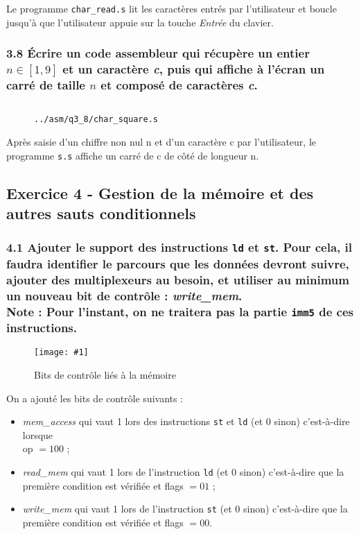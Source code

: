 \documentclass[twoside, 12pt, a4paper]{article}
\newcommand{\cf}[3]{
    \begin{figure}[!h]
        \centering
        \texttt{[image: \#1]}
    \caption{#3}\label{Fig:#1}
    \end{figure}
}
\newcommand{\hcf}[2]{\cf{#1}{.75}{#2}}
\newcommand{\fm}[2]{
\begin{figure}[!h]
    \centering
    \inputminted[]{asm}{#1}
    \caption{\texttt{#2}}
\end{figure}
}
\begin{document}
Le programme \texttt{char\_read.s} lit les caractères entrés par l'utilisateur et boucle jusqu'à que l'utilisateur appuie sur la touche \textit{Entrée} du clavier.

\clearpage

        \subsubsection*{\textbf{3.8} Écrire un code assembleur qui récupère un entier $n \in [1, 9]$ et un caractère \textit{c}, puis qui affiche à l'écran un carré de taille $n$ et composé de caractères \textit{c}.}

\fm{../asm/q3_8/char_square.s}{../asm/q3\_8/char\_square.s}

Après saisie d'un chiffre non nul n et d'un caractère c par l'utilisateur, le programme \texttt{s.s} affiche un carré de c de côté de longueur n. 
        
        \newpage

        \subsection{Exercice 4 - Gestion de la mémoire et des autres sauts conditionnels}

        \subsubsection*{\textbf{4.1} Ajouter le support des instructions \texttt{ld} et \texttt{st}. Pour cela, il faudra identifier le parcours que les données devront suivre, ajouter des multiplexeurs au besoin, et utiliser au minimum un nouveau bit de contrôle : \textit{write\_mem}.\\
        \textbf{Note : } Pour l'instant, on ne traitera pas la partie \texttt{imm5} de ces instructions.}

\hcf{ctrl_mem.png}{Bits de contrôle liés à la mémoire}

On a ajouté les bits de contrôle suivants :
\begin{itemize}
    \item \textit{mem\_access} qui vaut 1 lors des instructions \texttt{st} et \texttt{ld} (et 0 sinon) c'est-à-dire lorsque \\ op $= 100$ ;
    \item \textit{read\_mem} qui vaut 1 lors de l'instruction \texttt{ld} (et 0 sinon) c'est-à-dire que la première condition est vérifiée et flags $= 01$ ;
    \item \textit{write\_mem} qui vaut 1 lors de l'instruction \texttt{st} (et 0 sinon) c'est-à-dire que la première condition est vérifiée et flags $= 00$.
\end{itemize}
\end{document}
